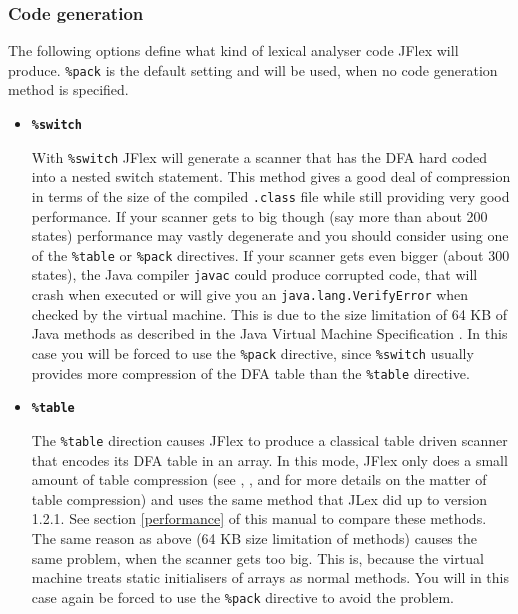\documentclass[11pt]{scrartcl}
\begin{document}
\subsubsection{Code generation\label{CodeGeneration}}
The following options define what kind of lexical analyser code JFlex
will produce. \texttt{\%pack} is the default setting and will be used,
when no code generation method is specified.
 
\begin{itemize}
\item 
  {\bf \tt \%switch}

  With \texttt{\%switch} JFlex will generate a scanner that has
  the DFA hard coded into a nested switch statement. This method gives
  a good deal of compression in terms of the size of the compiled 
  \texttt{.class} file while still providing very good performance. If your
  scanner gets to big though (say more than about 200 states)
  performance may vastly degenerate and you should consider using one
  of the \texttt{\%table} or \texttt{\%pack} directives. If your scanner
  gets even bigger (about 300 states), the Java compiler \texttt{javac}
  could produce corrupted code, that will crash when executed or will
  give you an \texttt{java.lang.VerifyError} when checked by the virtual
  machine. This is due to the size limitation of 64 KB of Java
  methods as described in the Java Virtual Machine Specification
  \cite{MachineSpec}. In this case you will be forced to use the 
  \texttt{\%pack} directive, since \texttt{\%switch}
  usually provides more compression of the DFA table than the 
  \texttt{\%table} directive.

 
\item
  {\bf \texttt{\%table}}
  
  The \texttt{\%table} direction causes JFlex to produce a classical
  table driven scanner that encodes its DFA table in an array.  In
  this mode, JFlex only does a small amount of table compression (see
  \cite{ParseTable}, \cite{SparseTable}, \cite{Aho} and \cite{Maurer}
  for more details on the matter of table compression) and uses the
  same method that JLex did up to version 1.2.1. See section \ref{performance}
   of this manual to compare
  these methods. The same reason as above (64 KB size limitation of
  methods) causes the same problem, when the scanner gets too big.
  This is, because the virtual machine treats static initialisers of
  arrays as normal methods. You will in this case again be forced to
  use the \texttt{\%pack} directive to avoid the problem.
 

\end{itemize}
\end{document}
